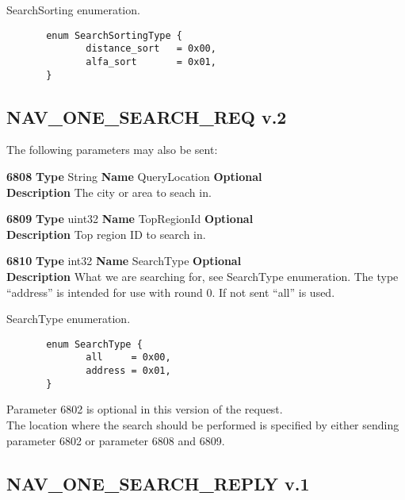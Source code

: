 \documentclass[a4paper]{article}
\begin{document}
\label{SearchSortingEnum} 
SearchSorting enumeration.
\begin{verbatim}
       enum SearchSortingType {
              distance_sort   = 0x00,
              alfa_sort       = 0x01,
       }
\end{verbatim}

\subsection{NAV\_ONE\_SEARCH\_REQ v.2}
The following parameters may also be sent:

\begin{list}{\textbf{ParamID}}{}
\item \textbf{6808} \textbf{Type} String \textbf{Name} QueryLocation
                 \textbf{Optional} \\
  \textbf{Description}  The city or area to seach in.

\item \textbf{6809} \textbf{Type} uint32 \textbf{Name} TopRegionId
                 \textbf{Optional} \\
  \textbf{Description} Top region ID to search in.

\item \textbf{6810} \textbf{Type} int32 \textbf{Name} SearchType
                 \textbf{Optional} \\
  \textbf{Description} What we are searching for, see SearchType
  enumeration. The type ``address'' is intended for use with round 0.
  If not sent ``all'' is used.

\end{list}

\label{SearchTypeEnum} 
SearchType enumeration.
\begin{verbatim}
       enum SearchType {
              all     = 0x00,
              address = 0x01,
       }
\end{verbatim}

Parameter 6802 is optional in this version of the request.\\
The location where the search should be performed is specified by either sending
parameter 6802 or parameter 6808 and 6809.

\subsection{NAV\_ONE\_SEARCH\_REPLY v.1}
\end{document}
